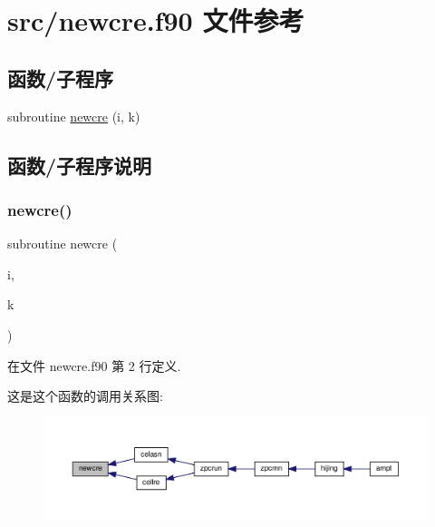 \hypertarget{newcre_8f90}{}\section{src/newcre.f90 文件参考}
\label{newcre_8f90}
\subsection*{函数/子程序}
\begin{DoxyCompactItemize}
\item 
subroutine \mbox{\hyperlink{newcre_8f90_a253179268965792eab650e79b147556f}{newcre}} (i, k)
\end{DoxyCompactItemize}


\subsection{函数/子程序说明}
\mbox{\label{newcre_8f90_a253179268965792eab650e79b147556f}} 
\subsubsection{\texorpdfstring{newcre()}{newcre()}}
{\footnotesize\ttfamily subroutine newcre (\begin{DoxyParamCaption}\item[{}]{i,  }\item[{}]{k }\end{DoxyParamCaption})}



在文件 newcre.\+f90 第 2 行定义.

这是这个函数的调用关系图\+:
\nopagebreak
\begin{figure}[H]
\begin{center}
\leavevmode
\includegraphics[width=350pt]{newcre_8f90_a253179268965792eab650e79b147556f_icgraph}
\end{center}
\end{figure}
